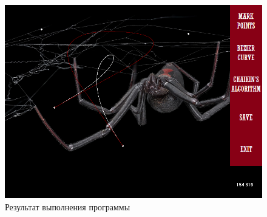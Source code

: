 \documentclass[14pt, a4paper]{extreport}
\begin{document}
\begin{figure}[h!]
	\centering
	\includegraphics[width = 13cm]{image/image_4}
  \caption{Результат выполнения программы}
\end{figure}
\end{document}

